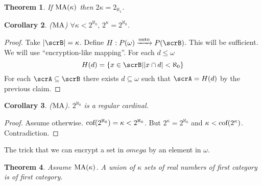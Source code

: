 \documentclass[11pt,pdftex,twoside,a4paper]{article}
\newcommand{\MA}{\ensuremath{\mathop{\rm MA}\nolimits}}
\newtheorem{thm}{Theorem}[section]
\newtheorem{corollary}[thm]{Corollary}
\begin{document}
\begin{thm}
If \(\MA(\kappa)\) then \(2\kappa = 2_{\aleph_1}\).
\end{thm}
\begin{corollary}
(\(\MA\)) \(\forall \kappa < 2^{\aleph_0},\,2^\kappa = 2^{\aleph_0}\).
\end{corollary}
\begin{proof}
Take \(|\scrB|=\kappa\).
Define \(H: P(\omega) \xrightarrow{\text{onto}} P(\scrB)\).
This will be sufficient. We will use ``encryption-like mapping''.
For each \(d\leq\omega\)
\begin{equation*}
H(d) = \{x\in\scrB| |x\cap d| < \aleph_0\}
\end{equation*}
For each \(\scrA\subseteq\scrB\) there exists \(d\subseteq\omega\)
such that \(\scrA = H(d)\) by the previous claim.
\end{proof}
\begin{corollary}
 (\MA). \(2^{\aleph_0}\) is a regular cardinal.
\end{corollary}
\begin{proof}
Assume otherwise. \(\textnormal{cof}(2^{\aleph_0})=\kappa < 2^{\aleph_0}\).
But \(2^\kappa = 2^{\aleph_0}\) and \(\kappa < \textnormal{cof}(2^\kappa)\).
Contradiction.
\end{proof}

The trick that we can encrypt a set in \(omega\) by an element in \(\omega\).

\begin{thm}
Assume \(\MA(\kappa)\).
A union of \(\kappa\) sets of real numbers of first category
is of first category.
\end{thm}


\end{document}
